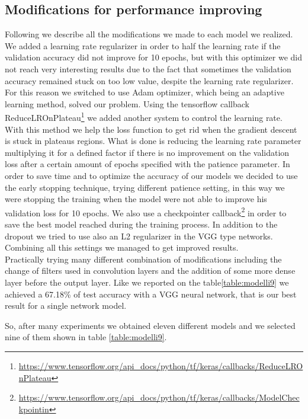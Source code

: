 \documentclass[10pt,twocolumn,letterpaper]{article}
\begin{document}
\subsection{Modifications for performance improving}
Following we describe all the modifications we made to each model we realized.
We added a learning rate regularizer in order to half the learning rate if the validation accuracy did not improve for 10 epochs, but with this optimizer we did not reach very interesting results due to the fact that sometimes the validation accuracy remained stuck on too low value, despite the learning rate regularizer. \\
For this reason we switched to use Adam optimizer, which being an adaptive learning method, solved our problem.
Using the tensorflow callback ReduceLROnPlateau\footnote{\url{https://www.tensorflow.org/api_docs/python/tf/keras/callbacks/ReduceLROnPlateau}} we added another system to control the learning rate. \\
With this method we help the loss function to get rid when the gradient descent is stuck in plateaus regions. What is done is reducing the learning rate parameter multiplying it for a defined factor if there is no improvement on the validation loss after a certain amount of epochs specified with the patience parameter. In order to save time and to optimize the accuracy of our models we decided to use the early stopping technique, trying different patience setting, in this way we were stopping the training when the model were not able to improve his validation loss for 10 epochs. We also use a checkpointer callback\footnote{\url{https://www.tensorflow.org/api_docs/python/tf/keras/callbacks/ModelCheckpointin}} in order to save the best model reached during the training process. In addition to the dropout we tried to use also an L2 regularizer in the VGG type networks. Combining all this settings we managed to get improved results.\\
Practically trying many different combination of modifications including the change of filters used in convolution layers and the addition of some more dense layer before the output layer. Like we reported on the table\ref{table:modelli9} we achieved a 67.18\% of test accuracy with a VGG neural network, that is our best result for a single network model. 

So, after many experiments we obtained eleven different models and we selected nine of them shown in table \ref{table:modelli9}. 
\end{document}
